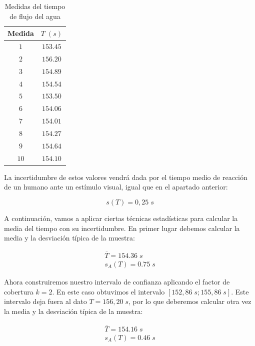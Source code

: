 \documentclass[a4paper,12pt,titlepage]{report}
\begin{document}
\begin{table}[h!]
    \centering
    \begin{tabular}{|c|c|}
    \hline
    Medida & $T \; (s)$\\ \hline
    $1$    & $153.45$ \\ \hline
    $2$    & $156.20$ \\ \hline
    $3$    & $154.89$ \\ \hline
    $4$    & $154.54$ \\ \hline
    $5$    & $153.50$ \\ \hline
    $6$    & $154.06$ \\ \hline
    $7$    & $154.01$ \\ \hline
    $8$    & $154.27$ \\ \hline
    $9$    & $154.64$ \\ \hline
    $10$   & $154.10$ \\ \hline
    \end{tabular}
    \caption{Medidas del tiempo de flujo del agua}
    \label{Tiempos agua}
    \end{table}

    \par La incertidumbre de estos valores vendrá dada por el tiempo medio de reacción de un humano ante un estímulo visual, igual que en el apartado anterior:

    \begin{equation}
        s(T) = 0,25 \; s
    \end{equation}    

    A continuación, vamos a aplicar ciertas técnicas estadísticas para calcular la media del tiempo con su incertidumbre. En primer lugar debemos calcular la media y la desviación típica de la muestra:

    \begin{equation}
        \begin{gathered}
            \overline{T} = 154.36 \; s \\
            s_A (T) = 0.75 \; s
        \end{gathered}
    \end{equation}
    
    Ahora construiremos nuestro intervalo de confianza aplicando el factor de cobertura $k=2$. En este caso obtuvimos el intervalo $[152,86\; s;155,86\; s]$. Este intervalo deja fuera al dato $T=156,20 \; s$, por lo que deberemos calcular otra vez la media y la desviación típica de la muestra:
    
    \begin{equation}
        \begin{gathered}
            \overline{T} = 154.16 \; s \\
            s_A (T) = 0.46 \; s
        \end{gathered}
    \end{equation}
    
\end{document}
